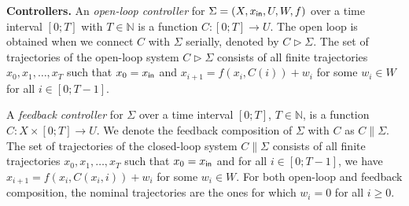 %
%
%
%
%

\smallskip\noindent
\textbf{Controllers.} 
%
An \emph{open-loop controller} for $\Sigma=(X,x_{\mathsf{in}},U,W,f)$ over a time interval $[0;T]$ with $T\in\mathbb N$ 
is a function $C\colon [0;T]\to U$. 
The open loop is obtained when we connect $C$ with $\Sigma$ serially,
 denoted by $C \triangleright \Sigma$. 
The set of trajectories of the open-loop system $C\triangleright\Sigma$ consists of all finite trajectories
$x_0, x_1, \ldots, x_T$ such that $x_0 = x_{\mathsf{in}}$ and $x_{i+1} = f(x_i, C(i)) + w_i$ for some $w_i \in W$ for all $i \in [0; T-1]$.

A \emph{feedback controller} for $\Sigma$ over a time interval $[0;T]$, $T\in \mathbb N$, 
is a function $C\colon X\times[0;T]\to U$. 
We denote the feedback composition of $\Sigma$ with $C$ as $C \parallel \Sigma$.
The set of trajectories of the closed-loop system $C\parallel\Sigma$ consists of all finite trajectories
$x_0, x_1, \ldots, x_T$ such that $x_0 = x_{\mathsf{in}}$ and for all $i \in [0; T-1]$, we have $x_{i+1} = f(x_i, C(x_i, i)) + w_i$ for some $w_i \in W$.
For both open-loop and feedback composition, the nominal trajectories are the ones for which $w_i = 0$ for all $i\geq 0$.

